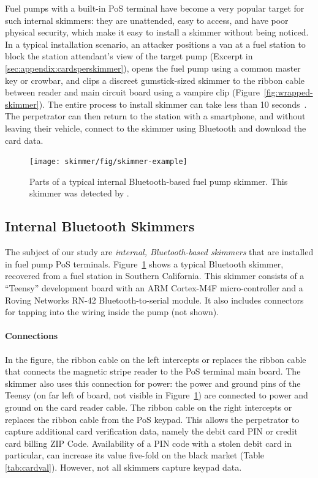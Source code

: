 Fuel pumps
with a built-in PoS terminal have become a very popular target for such internal skimmers: they are unattended, easy
to access, and have poor physical security, which make it easy to install a skimmer without being noticed.
%
In a typical installation scenario, an attacker positions a van at a fuel station to block the station attendant's view of
the target pump (Excerpt in \ref{sec:appendix:cardsperskimmer}), opens the fuel pump using a common master key or crowbar, and clips a discreet gumstick-sized skimmer to the
ribbon cable between reader and main circuit board using a vampire clip (Figure~\ref{fig:wrapped-skimmer}). 
The entire process to install skimmer can
take less than 10 seconds~\cite{arizonareport}. The perpetrator can then return to the station with a 
smartphone, and without leaving their vehicle, connect to the skimmer using Bluetooth and download the card data.

\begin{figure}
    \centering
    \texttt{[image: skimmer/fig/skimmer-example]}
    \captionsetup{justification=centering}
    \caption{Parts of a typical internal Bluetooth-based fuel pump skimmer. This skimmer
    was detected by \bluetana.}
    \label{fig:skimmer-example}
\end{figure}

\subsection{Internal Bluetooth Skimmers}
\label{sec:bkgd-skimhw}

The subject of our study are \emph{internal, Bluetooth-based skimmers} that are installed in fuel pump PoS
terminals. 
%
Figure~\ref{fig:skimmer-example} shows a typical Bluetooth skimmer, recovered from a fuel station in Southern California. This skimmer consists of a ``Teensy'' development board with an ARM Cortex-M4F
micro-controller and a Roving Networks \xspace{RN-42} Bluetooth-to-serial module. It also includes connectors 
for tapping into the wiring inside the pump (not shown). 

\paragraph{Connections} In the figure, the ribbon cable on the left intercepts or replaces the ribbon cable that connects the
magnetic stripe reader to the PoS terminal main board. The skimmer also uses this connection for power: the power and
ground pins of the Teensy (on far left of board, not visible in Figure~\ref{fig:skimmer-example}) are connected to
power and ground on the card reader cable. The ribbon cable on the right intercepts or replaces the ribbon cable from
the PoS keypad. This allows the perpetrator to capture additional card verification data, namely the debit card PIN
or credit card billing ZIP Code. Availability of a PIN code with a stolen debit card in particular, can increase its
value five-fold on the black market (Table \ref{tab:cardval}). However, not all skimmers capture keypad data.

